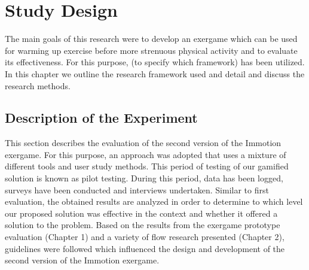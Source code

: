 \chapter{Study Design}\label{chapter:studydesign}
The main goals of this research were to develop an exergame which can be used for warming up exercise before more strenuous physical activity and to evaluate its effectiveness. For this purpose, (to specify which framework) has been utilized.  In this chapter we outline the research framework used and detail and discuss the research methods. 
\section{Description of the Experiment}
This section describes the evaluation of the second version of the Immotion exergame. For this purpose, an approach was adopted that uses a mixture of different tools and user study methods. This period of testing of our gamified solution is known as pilot testing. During this period, data has been logged, surveys have been conducted and interviews undertaken. Similar to first evaluation, the obtained results are analyzed in order to determine to which level our proposed solution was effective in the context and whether it offered a solution to the problem. Based on the results from the exergame prototype evaluation (Chapter 1) and a variety of flow research presented (Chapter 2), guidelines were followed which influenced the design and development of the second version of the Immotion exergame. 

